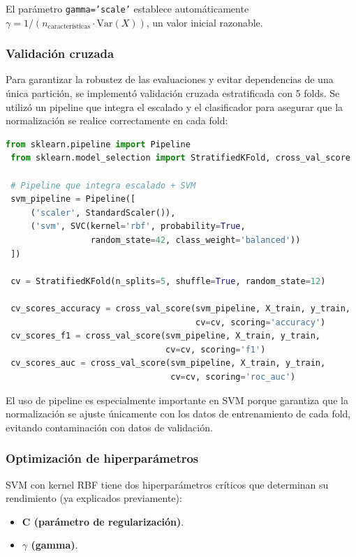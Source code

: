 El parámetro \texttt{gamma='scale'} establece automáticamente \(\gamma = 1/(n_{\text{características}} \cdot \text{Var}(X))\), un valor inicial razonable.

\subsubsection*{Validación cruzada}

Para garantizar la robustez de las evaluaciones y evitar dependencias de una única partición, se implementó validación cruzada estratificada con 5 folds. Se utilizó un pipeline que integra el escalado y el clasificador para asegurar que la normalización se realice correctamente en cada fold:

 \begin{lstlisting}[language=Python, caption=Pipeline con validación cruzada para SVM]
 from sklearn.pipeline import Pipeline
 from sklearn.model_selection import StratifiedKFold, cross_val_score

 # Pipeline que integra escalado + SVM
 svm_pipeline = Pipeline([
     ('scaler', StandardScaler()),
     ('svm', SVC(kernel='rbf', probability=True, 
                 random_state=42, class_weight='balanced'))
 ])

 cv = StratifiedKFold(n_splits=5, shuffle=True, random_state=12)

 cv_scores_accuracy = cross_val_score(svm_pipeline, X_train, y_train, 
                                      cv=cv, scoring='accuracy')
 cv_scores_f1 = cross_val_score(svm_pipeline, X_train, y_train, 
                                cv=cv, scoring='f1')
 cv_scores_auc = cross_val_score(svm_pipeline, X_train, y_train, 
                                 cv=cv, scoring='roc_auc')
 \end{lstlisting}

El uso de pipeline es especialmente importante en SVM porque garantiza que la normalización se ajuste únicamente con los datos de entrenamiento de cada fold, evitando contaminación con datos de validación.

\subsubsection*{Optimización de hiperparámetros}

SVM con kernel RBF tiene dos hiperparámetros críticos que determinan su rendimiento (ya explicados previamente):

\begin{itemize}
    \item \textbf{C (parámetro de regularización)}.
    
    \item \textbf{\(\gamma\) (gamma)}.
\end{itemize}

